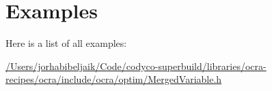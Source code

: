 \section{Examples}
Here is a list of all examples\+:\begin{DoxyCompactItemize}
\item 
\hyperlink{_2Users_2jorhabibeljaik_2Code_2codyco-superbuild_2libraries_2ocra-recipes_2ocra_2include_2ocra_27dfe52ed2d2fe1904154f5be9150e8b1}{/\+Users/jorhabibeljaik/\+Code/codyco-\/superbuild/libraries/ocra-\/recipes/ocra/include/ocra/optim/\+Merged\+Variable.\+h}
\end{DoxyCompactItemize}
